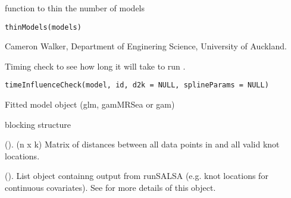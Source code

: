 \documentclass[a4paper]{book}
\begin{document}
%
\begin{Examples}
\end{Examples}
%
\begin{Description}\relax
function to thin the number of models
\end{Description}
%
\begin{Usage}
\begin{verbatim}
thinModels(models)
\end{verbatim}
\end{Usage}
%
\begin{Author}\relax
Cameron Walker, Department of Enginering Science, University of Auckland.
\end{Author}
%
\begin{Description}\relax
Timing check to see how long it will take to run .
\end{Description}
%
\begin{Usage}
\begin{verbatim}
timeInfluenceCheck(model, id, d2k = NULL, splineParams = NULL)
\end{verbatim}
\end{Usage}
%
\begin{Arguments}
\begin{ldescription}
\item[\code{model}] Fitted model object (glm, gamMRSea or gam)

\item[\code{id}] blocking structure

\item[\code{d2k}] (). (n x k) Matrix of distances between all data points in  and all valid knot locations.

\item[\code{splineParams}] (). List object containng output from runSALSA (e.g. knot locations for continuous covariates). See  for more details of this object.
\end{ldescription}
\end{Arguments}
\end{document}
